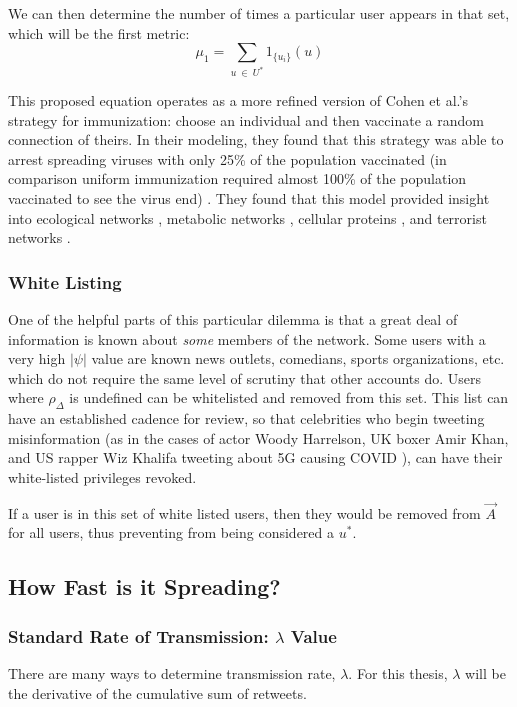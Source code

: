 \documentclass[preprint,review,12pt]{elsarticle}
\begin{document}
We can then determine the number of times a particular user appears in that set, which will be the first metric: 
\begin{equation}
\label{mu_1 equation}
    \mu_1 = \sum_{u\ \in \ U^*}1_{\{u_i\}}(u)
\end{equation}

This proposed equation operates as a more refined version of Cohen et al.'s strategy for immunization: choose an individual and then vaccinate a random connection of theirs. In their modeling, they found that this strategy was able to arrest spreading viruses with only 25\% of the population vaccinated (in comparison uniform immunization required almost 100\% of the population vaccinated to see the virus end) \cite{cohen2003efficient}. They found that this model provided insight into ecological networks \cite{sole2001complexity,camacho2002robust}, metabolic networks \cite{jeong2000large}, cellular proteins \cite{jeong2001lethality}, and terrorist networks \cite{cohen2003efficient}. 

\subsubsection{White Listing}
\label{sec: white listing}
One of the helpful parts of this particular dilemma is that a great deal of information is known about \textit{some} members of the network. Some users with a very high $|\psi|$ value are known news outlets, comedians, sports organizations, etc. which do not require the same level of scrutiny that other accounts do. Users where $\rho_{\Delta}$ is undefined can be whitelisted and removed from this set. This list can have an established cadence for review, so that celebrities who begin tweeting misinformation (as in the cases of actor Woody Harrelson, UK boxer Amir Khan, and US rapper Wiz Khalifa tweeting about 5G causing COVID \cite{bruns2020covid19}), can have their white-listed privileges revoked. 

If a user is in this set of white listed users, then they would be removed from $\vec{A}$ for all users, thus preventing from being considered a $u^*$.


\subsection{How Fast is it Spreading?}
\subsubsection{Standard Rate of Transmission: $\lambda$ Value}
There are many ways to determine transmission rate, $\lambda$. For this thesis, $\lambda$ will be the derivative of the cumulative sum of retweets. 
\end{document}
